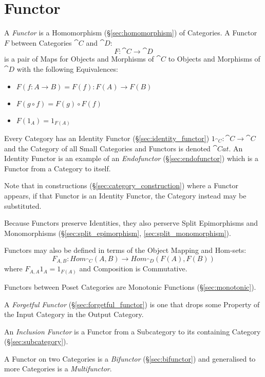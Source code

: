 \section{Functor}\label{sec:functor}

A \emph{Functor} is a Homomorphism (\S\ref{sec:homomorphism}) of
Categories. A Functor $F$ between Categories $\cat{C}$ and
$\cat{D}$:
\[
  F : \cat{C} \rightarrow \cat{D}
\]
is a pair of Maps for Objects and Morphisms of $\cat{C}$ to Objects
and Morphisms of $\cat{D}$ with the following Equivalences:
\begin{itemize}
\item $F(f : A \rightarrow B) = F(f) : F(A) \rightarrow F(B)$
\item $F(g \circ f) = F(g) \circ F(f)$
\item $F(1_A) = 1_{F(A)}$
\end{itemize}
Every Category has an Identity Functor (\S\ref{sec:identity_functor})
$1_{\cat{C}} : \cat{C} \rightarrow \cat{C}$ and the Category
of all Small Categories and Functors is denoted $\cat{Cat}$. An
Identity Functor is an example of an \emph{Endofunctor}
(\S\ref{sec:endofunctor}) which is a Functor from a Category to
itself.

Note that in constructions (\S\ref{sec:category_construction}) where a
Functor appears, if that Functor is an Identity Functor, the Category
instead may be substituted.

Because Functors preserve Identities, they also perserve Split
Epimorphisms and Monomorphisms (\S\ref{sec:split_epimorphism},
\ref{sec:split_monomorphism}).

Functors may also be defined in terms of the Object Mapping and
Hom-sets:
\[
  F_{A,B} : Hom_{\cat{C}}(A,B) \rightarrow Hom_{\cat{D}}(F(A),F(B))
\]
where $F_{A,A}1_A = 1_{F(A)}$ and Composition is Commutative.

Functors between Poset Categories are Monotonic Functions
(\S\ref{sec:monotonic}).

A \emph{Forgetful Functor} (\S\ref{sec:forgetful_functor}) is one that
drops some Property of the Input Category in the Output Category.

An \emph{Inclusion Functor} is a Functor from a Subcategory to its
containing Category (\S\ref{sec:subcategory}).

A Functor on two Categories is a \emph{Bifunctor}
(\S\ref{sec:bifunctor}) and generalised to more Categories is a
\emph{Multifunctor}.

